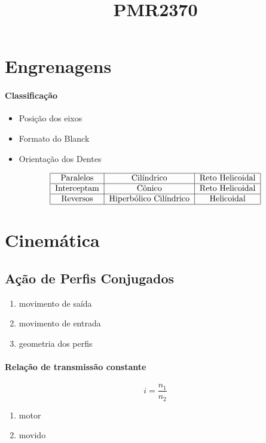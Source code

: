 \documentclass[a4paper, 12pt]{article}
\title{PMR2370}
\begin{document}
\maketitle

\section{Engrenagens}
\paragraph{Classificação}
\begin{itemize}
\item Posição dos eixos
\item Formato do Blanck
\item Orientação dos Dentes
\end{itemize}

\[\begin{tabular}{|c|c|c|}
\hline 
Paralelos & Cilíndrico & Reto Helicoidal \\ 
\hline 
Interceptam & Cônico & Reto Helicoidal \\ 
\hline 
Reversos & Hiperbólico Cilíndrico & Helicoidal \\ 
\hline 
\end{tabular} \]

\section{Cinemática}
\subsection{Ação de Perfis Conjugados}
\begin{enumerate}
\item movimento de saída
\item movimento de entrada
\item geometria dos perfis
\end{enumerate}

\paragraph*{Relação de transmissão constante}
\[i=\frac{n_{1}}{n_{2}}\]
\begin{enumerate}
\item motor
\item movido
\end{enumerate}
\end{document}
